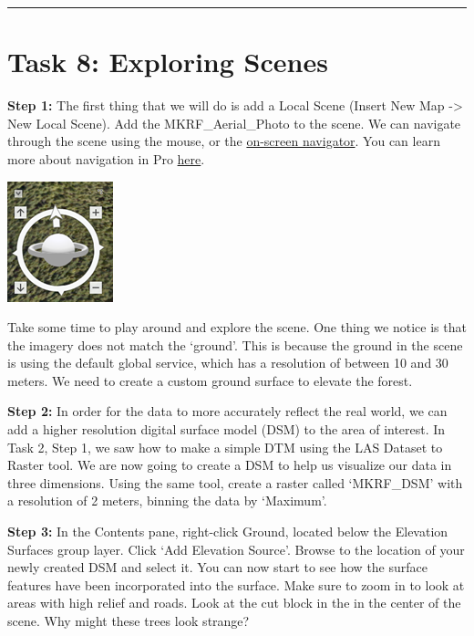 \documentclass[
]{book}
\begin{document}
\begin{center}\rule{0.5\linewidth}{0.5pt}\end{center}

\hypertarget{task-8-exploring-scenes}{%
\section*{Task 8: Exploring Scenes}\label{task-8-exploring-scenes}}

\textbf{Step 1:} The first thing that we will do is add a Local Scene (Insert New Map -\textgreater{} New Local Scene). Add the MKRF\_Aerial\_Photo to the scene. We can navigate through the scene using the mouse, or the \href{https://www.youtube.com/watch?v=vMLG3iduw50}{on-screen navigator}. You can learn more about navigation in Pro \href{https://pro.arcgis.com/en/pro-app/help/mapping/navigation/navigation-in-arcgis-pro.htm}{here}.

\begin{center}\includegraphics[width=0.15\linewidth]{images/04-on-screen-navigator} \end{center}

Take some time to play around and explore the scene. One thing we notice is that the imagery does not match the `ground'. This is because the ground in the scene is using the default global service, which has a resolution of between 10 and 30 meters. We need to create a custom ground surface to elevate the forest.

\textbf{Step 2:} In order for the data to more accurately reflect the real world, we can add a higher resolution digital surface model (DSM) to the area of interest. In Task 2, Step 1, we saw how to make a simple DTM using the LAS Dataset to Raster tool. We are now going to create a DSM to help us visualize our data in three dimensions. Using the same tool, create a raster called `MKRF\_DSM' with a resolution of 2 meters, binning the data by `Maximum'.

\textbf{Step 3:} In the Contents pane, right-click Ground, located below the Elevation Surfaces group layer. Click `Add Elevation Source'. Browse to the location of your newly created DSM and select it. You can now start to see how the surface features have been incorporated into the surface. Make sure to zoom in to look at areas with high relief and roads. Look at the cut block in the in the center of the scene. Why might these trees look strange?
\end{document}
